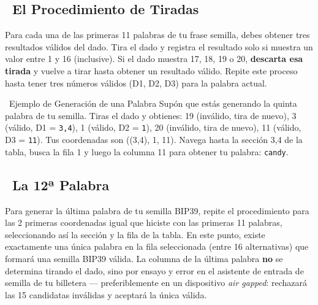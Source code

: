 \documentclass[10pt]{article}
\begin{document}
\subsection*{~El Procedimiento de Tiradas}

Para cada una de las primeras 11 palabras de tu frase semilla, debes obtener tres resultados válidos del dado. Tira el dado y registra el resultado solo si muestra un valor entre 1 y 16 (inclusive). Si el dado muestra 17, 18, 19 o 20, \textbf{descarta esa tirada} y vuelve a tirar hasta obtener un resultado válido. Repite este proceso hasta tener tres números válidos (D1, D2, D3) para la palabra actual.

\begin{examplebox}{\faLightbulb~Ejemplo de Generación de una Palabra}
Supón que estás generando la quinta palabra de tu semilla. Tiras el dado y obtienes: 19 (inválido, tira de nuevo), 3 (válido, D1 = \texttt{3,4}), 1 (válido, D2 = \texttt{1}), 20 (inválido, tira de nuevo), 11 (válido, D3 = \texttt{11}). Tus coordenadas son ((3,4), 1, 11). Navega hasta la sección 3,4 de la tabla, busca la fila 1 y luego la columna 11 para obtener tu palabra: \texttt{candy}.
\end{examplebox}

\subsection*{\faPen~La 12ª Palabra}

Para generar la última palabra de tu semilla BIP39, repite el procedimiento para las 2 primeras coordenadas igual que hiciste con las primeras 11 palabras, seleccionando así la sección y la fila de la tabla. En este punto, existe exactamente una única palabra en la fila seleccionada (entre 16 alternativas) que formará una semilla BIP39 válida. La columna de la última palabra \textbf{no} se determina tirando el dado, sino por ensayo y error en el asistente de entrada de semilla de tu billetera --- preferiblemente en un dispositivo \textit{air gapped}: rechazará las 15 candidatas inválidas y aceptará la única válida.
\end{document}
